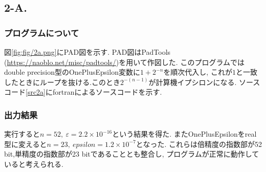 \subsection*{2-A.}
\subsubsection*{プログラムについて}
図\ref{fig:fig/2a.png}にPAD図を示す.
PAD図はPadTools (\url{https://naoblo.net/misc/padtools/})を用いて作図した.
このプログラムではdouble precision型のOnePlusEpsilon変数に$1+2^{-n}$を順次代入し,
これが$1$と一致したときにループを抜ける.このとき$2^{-(n-1)}$が計算機イプシロンになる.
ソースコード\ref{src2a}にfortranによるソースコードを示す.
\subsubsection*{出力結果}
実行すると$n = 52,\ \varepsilon = 2.2\times10^{-16}$という結果を得た.
またOnePlusEpsilonをreal型に変えると$n = 23,\ epsilon = 1.2\times10^{-7}$となった.
これらは倍精度の指数部が52 bit,単精度の指数部が23 bitであることとも整合し,
プログラムが正常に動作していると考えられる.\cite{floating}